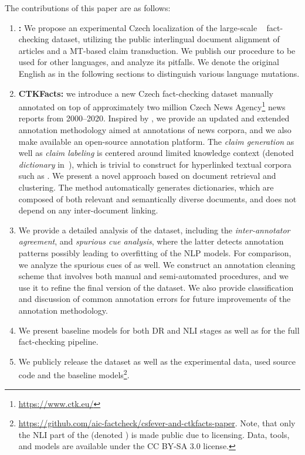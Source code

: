 The contributions of this paper are as follows:
\begin{comment}
  TODO:
  In contribution (3.), I think the inter-annotator agreement should not really
be counted as  detailed analysis of the CTKFacts dataset, as it is, and should
be, an inherent and mandatory part of contribution (2.) CTKFacts.
\end{comment}
\begin{enumerate}
    \item \textbf{\FCZ:} We propose an experimental Czech localization of the large-scale \FEVER~\cite{fever2018} fact-checking dataset, utilizing the public \MediaWiki interlingual document alignment of \Wikipedia articles and a MT-based claim transduction.
    We publish our procedure to be used for other languages, and analyze its pitfalls.
    We denote the original English \FEVER as \FEN in the following sections to distinguish various language mutations.
    \item \textbf{CTKFacts:} we introduce a new Czech fact-checking dataset manually annotated on top of approximately two million Czech News Agency\footnote{\url{https://www.ctk.eu/}} news reports from 2000--2020.
    Inspired by \FEVER, we provide an updated and extended annotation methodology aimed at annotations of news corpora, and we also make available an open-source annotation platform.
    The \textit{claim generation} as well as \textit{claim labeling} is centered around limited  knowledge context (denoted \textit{dictionary} in~\cite{fever2018}), which is trivial to construct for hyperlinked textual corpora such as \Wikipedia.
    We present a novel approach based on document retrieval and clustering.
    The method automatically generates dictionaries, which are composed of both relevant and semantically diverse documents, and does not depend on any inter-document linking.
    \item We provide a detailed analysis of the \CTK dataset, including the \textit{inter-annotator agreement}, and \textit{spurious cue analysis}, where the latter detects annotation patterns possibly leading to overfitting of the NLP models.
    For comparison, we analyze the spurious cues of \FCZ as well.
    We construct an annotation cleaning scheme that involves both manual and semi-automated procedures, and we use it to refine the final version of the \CTK dataset.
    We also provide classification and discussion of common annotation errors for future improvements of the annotation methodology.
    \item We present baseline models for both DR and NLI stages as well as for the full fact-checking pipeline.
    \item We publicly release the \CTK dataset as well as the experimental \FCZ data, used source code and the baseline models\footnote{\url{https://github.com/aic-factcheck/csfever-and-ctkfacts-paper}. Note, that only the NLI part of the \CTK  (denoted \CTKNLI) is made public due to licensing. Data, tools, and models are available under the \textsf{CC BY-SA 3.0} license.}.
\end{enumerate}

